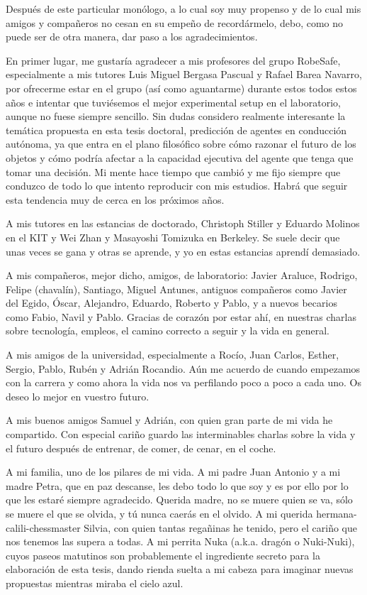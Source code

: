 Después de este particular monólogo, a lo cual soy muy propenso y de lo cual mis amigos y compañeros no cesan en su empeño de recordármelo, debo, como no puede ser de otra manera, dar paso a los agradecimientos.


En primer lugar, me gustaría agradecer a mis profesores del grupo RobeSafe, especialmente a mis tutores Luis Miguel Bergasa Pascual y Rafael Barea Navarro, por ofrecerme estar en el grupo (así como aguantarme) durante estos todos estos años e intentar que tuviésemos el mejor experimental setup en el laboratorio, aunque no fuese siempre sencillo. Sin dudas considero realmente interesante la temática propuesta en esta tesis doctoral, predicción de agentes en conducción autónoma, ya que entra en el plano filosófico sobre cómo razonar el futuro de los objetos y cómo podría afectar a la capacidad ejecutiva del agente que tenga que tomar una decisión. Mi mente hace tiempo que cambió y me fijo siempre que conduzco de todo lo que intento reproducir con mis estudios. Habrá que seguir esta tendencia muy de cerca en los próximos años.

A mis tutores en las estancias de doctorado, Christoph Stiller y Eduardo Molinos en el KIT y Wei Zhan y Masayoshi Tomizuka en Berkeley. Se suele decir que unas veces se gana y otras se aprende, y yo en estas estancias aprendí demasiado.

A mis compañeros, mejor dicho, amigos, de laboratorio: Javier Araluce, Rodrigo, Felipe (chavalín), Santiago, Miguel Antunes,
antiguos compañeros como Javier del Egido, Óscar, Alejandro, Eduardo, Roberto y Pablo, y a nuevos becarios como Fabio, Navil y Pablo. Gracias de corazón por estar ahí, en nuestras charlas sobre tecnología, empleos, el camino correcto a seguir y la vida en general.

A mis amigos de la universidad, especialmente a Rocío, Juan Carlos, Esther, Sergio, Pablo, Rubén y Adrián Rocandio. Aún me acuerdo de cuando empezamos con la carrera y como ahora la vida nos va perfilando poco a poco a cada uno. Os deseo lo mejor en vuestro futuro.

A mis buenos amigos Samuel y Adrián, con quien gran parte de mi vida he compartido. Con especial cariño guardo las interminables charlas sobre la vida y el futuro después de entrenar, de comer, de cenar, en el coche.

A mi familia, uno de los pilares de mi vida. A mi padre Juan Antonio y a mi madre Petra, que en paz descanse, les debo todo lo que soy y es por ello por lo que les estaré siempre agradecido. Querida madre, no se muere quien se va, sólo se muere el que se olvida, y tú nunca caerás en el olvido. A mi querida hermana-calili-chessmaster Silvia, con quien tantas regañinas he tenido, pero el cariño que nos tenemos las supera a todas. A mi perrita Nuka (a.k.a. dragón o Nuki-Nuki), cuyos paseos matutinos son probablemente el ingrediente secreto para la elaboración de esta tesis, dando rienda suelta a mi cabeza para imaginar nuevas
propuestas mientras miraba el cielo azul. 

